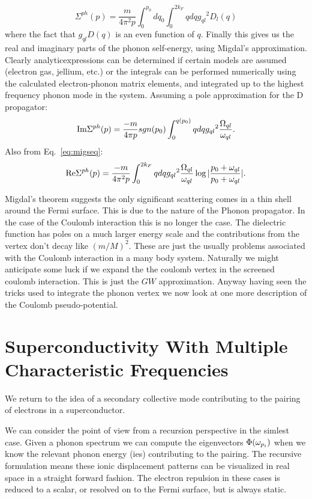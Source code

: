 %
\begin{equation}
\Sigma^{ph} (p) = \frac{m}{4\pi^{2} p}\int_{0}^{p_{0}}dq_{0}\int_{0}^{2k_{F}}q dq {g_{ql}}^{2}D_{l}(q)
\end{equation}
%
where the fact that $g_{ql}D(q)$ is an even function of $q$.
%
Finally this gives us the real and imaginary parts of the phonon self-energy, using Migdal's approximation.
Clearly  analyticexpressions can be determined if certain models are assumed (electron gas, jellium, etc.) or the
integrals can be performed numerically using the calculated electron-phonon matrix elements, and 
integrated up to the highest frequency phonon mode in the system. Assuming a pole approximation for 
the D propagator:
%
\begin{equation}
{\rm Im} \Sigma^{ph}(p) = \frac{-m}{4\pi p} sgn(p_0)\int_{0}^{q(p_0)}q dq{g_{ql}}^{2}\frac{\Omega_{ql}}{\omega_{ql}}. 
\end{equation}
%
Also from Eq.~\ref{eq:migseq}:
%
\begin{equation}
{\rm Re} \Sigma^{ph}(p) = \frac{-m}{4\pi^{2} p} \int_{0}^{2k_{F}}q dq{g_{ql}}^{2}\frac{\Omega_{ql}}{\omega_{ql}} 
\log|\frac{p_0 +\omega_{ql}}{p_{0}+\omega_{ql}}|.
\end{equation}

Migdal's theorem suggests the only significant scattering comes in a thin shell around the Fermi surface.
This is due to the nature of the Phonon propagator. In the case of the Coulomb interaction this is no longer the case.
The dielectric function has poles on a much larger energy scale and the contributions from the vertex don't
decay like $(m/M)^{2}$. These are just the usually problems associated with the Coulomb interaction in a many body
system. Naturally we might anticipate some luck if we expand the the coulomb vertex in the screened coulomb interaction.
This is just the $GW$ approximation. Anyway having seen the tricks used to integrate the phonon vertex we now look
at one more description of the Coulomb pseudo-potential.
%

\section{Superconductivity With Multiple Characteristic Frequencies}
We return to the idea of a secondary collective mode contributing to the pairing of 
electrons in a superconductor.

We can consider the point of view from a recursion perspective in the simlest case.
Given a phonon spectrum we can compute the eigenvectors $\Phi(\omega_{p_{i}})$ when we know the
relevant phonon energy (ies) contributing to the pairing. The recursive formulation means these 
ionic displacement patterns can be visualized in real space in a straight forward fashion.
The electron repulsion in these cases is reduced to a scalar, or resolved on to the Fermi surface,
but is always static. 

